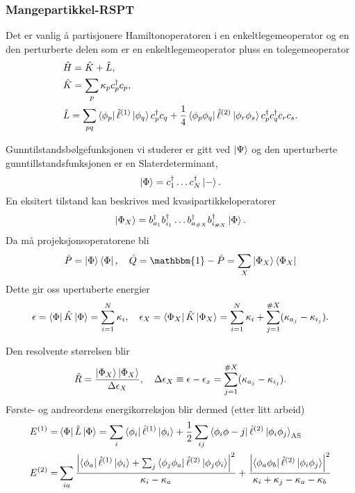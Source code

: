 \documentclass{beamer}
\begin{document}
\begin{frame}
	
	\frametitle{Mangepartikkel-RSPT}

	Det er vanlig å partisjonere Hamiltonoperatoren i en enkeltlegemeoperator og en den perturberte delen som er en enkeltlegemeoperator pluss en tolegemeoperator
	\begin{align}
		&\hat H = \hat K + \hat L, \\
		&\hat K = \sum_p \kappa_p c^\dagger_p c_p, \\
		&\hat L = \sum_{pq} \bra{\phi_p} \hat \ell^{(1)}\ket{\phi_q}c^\dagger_p c_q + \frac{1}{4}\bra{\phi_p\phi_q}\hat \ell^{(2)} \ket{\phi_r\phi_s}c^\dagger_p c^\dagger_q c_r c_s.
	\end{align}	
	
\end{frame}

\begin{frame}
	Gunntilstandsbølgefunksjonen vi studerer er gitt ved $\ket{\Psi}$ og den uperturberte gunntillstandsfunksjonen er en Slaterdeterminant,
	\begin{equation}
		\ket{\Phi} = c_1^\dagger \dots c^\dagger_N \ket{-}.
	\end{equation}
	En eksitert tilstand kan beskrives med kvasipartikkeloperatorer
	\begin{equation}
		\ket{\Phi_X} = b^\dagger_{a_1}b^\dagger_{i_1} \dots b^\dagger_{a_{\#X}}b^\dagger_{i_{\#X}} \ket{\Phi}.
	\end{equation}
	Da må projeksjonsoperatorene bli
	\begin{equation}
		\hat P = \ket{\Phi}\bra{\Phi}, \quad \hat Q = \mathbbm{1} - \hat P = \sum_{X}\ket{\Phi_X}\bra{\Phi_X}
	\end{equation}
	Dette gir oss upertuberte energier
	\begin{equation}
		\epsilon = \bra{\Phi}\hat K\ket{\Phi} = \sum_{i=1}^N \kappa_i, \quad \epsilon_X = \bra{\Phi_X} \hat K \ket{\Phi_X} = \sum_{i=1}^N\kappa_i + \sum_{j=1}^{\#X}(\kappa_{a_j} - \kappa_{i_j}).
	\end{equation}
\end{frame}

\begin{frame}
	Den resolvente størrelsen blir
	\begin{equation}
		\hat R = \frac{\ket{\Phi_X}\ket{\Phi_X}}{\Delta\epsilon_X}, \quad \Delta\epsilon_X \equiv \epsilon - \epsilon_x = \sum_{j=1}^{\#X}(\kappa_{a_j} - \kappa_{i_j}).
	\end{equation}
	 Første- og andreordens energikorreksjon blir dermed (etter litt arbeid)
	 \begin{align}
	 E^{(1)} =& \bra{\Phi}\hat L \ket{\Phi} = \sum_i \bra{\phi_i} \hat \ell^{(1)}\ket{\phi_i} + \frac{1}{2}\sum_{ij}\bra{\phi_i\phi-j}\hat \ell^{(2)} \ket{\phi_i \phi_j}_{\text{AS}} \\
	 E^{(2)} =& \sum_{ia}\frac{\abs{\bra{\phi_a}\hat \ell^{(1)} \ket{\phi_i} + \sum_j \bra{\phi_j\phi_a} \hat \ell^{(2)}\ket{\phi_j \phi_i}}^2}{\kappa_i - \kappa_a}  + \frac{\abs{\bra{\phi_a \phi_b} \hat \ell^{(2)} \ket{\phi_i \phi_j}}^2}{\kappa_i + \kappa_j - \kappa_a - \kappa_b}
	 \end{align}
\end{frame}
\end{document}
